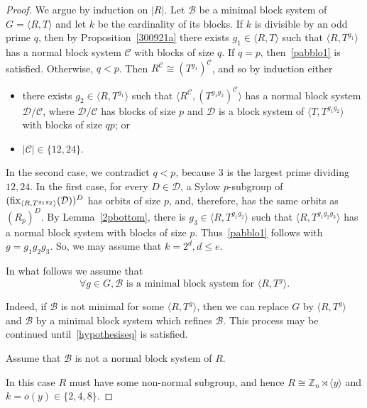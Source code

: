\documentclass[11pt]{amsart}
\numberwithin{equation}{section}
\theoremstyle{definition}
\newcounter{case}
\newenvironment{case}{\refstepcounter{case}
	\medskip \noindent {\bf Case \textup{\thecase.  }}}{\upshape}
\renewcommand{\thecase}{\arabic{case}}
\def\fix{{\rm fix}}
\def\Z{{\mathbb Z}}
\newcommand{\sg}[1]{\langle{#1}\rangle}
\begin{document}
	\begin{proof}
		We argue by
		induction on $|R|$. Let ${\mathcal  B}$ be a minimal  block system of $G=\langle R,T\rangle$ and let $k$ be the cardinality of its blocks.  If $k$ is divisible by an odd prime $q$, then by Proposition~\ref{300921a} there exists $g_1\in \sg{R,T}$ such that $\sg{R,T^{g_1}}$ has a normal block system ${\mathcal  C}$ with blocks of size $q$. If $q = p$, then~\eqref{pabblo1} is satisfied.  Otherwise, $q < p$.  Then $R^{\mathcal  C}\cong (T^{g_1})^{\mathcal  C}$, and so by induction either
		\begin{itemize}
			\item there exists $g_2\in\sg{R,T^{g_1}}$ such that $\sg{R^{\mathcal{C}},(T^{g_1g_2})^{\mathcal{C}}}$ has a normal block system ${\mathcal  D}/{\mathcal  C}$, where ${\mathcal  D}/{\mathcal  C}$ has blocks of size $p$ and ${\mathcal  D}$ is a block system of $\sg{T,T^{g_1g_2}}$ with blocks of size $qp$; or
			\item $|\mathcal{C}|\in \{12,24\}$.
		\end{itemize}
		In the second case, we contradict $q<p$, because $3$ is the largest prime dividing $12,24$.  In the first case, for every $D\in{\mathcal  D}$, a Sylow $p$-subgroup of $(\fix_{\sg{R,T^{g_1g_2}}}({\mathcal  D}))^D$ has 
		orbits of size $p$, and, therefore, has the same orbits as $(R_p)^D$.  By Lemma~\ref{2pbottom}, there is $g_3\in \sg{R,T^{g_1g_2}}$ such that $\sg{R,T^{g_1g_2g_3}}$ has a normal block system with blocks of size $p$. Thus~\eqref{pabblo1} follows with $g = g_1g_2g_3$.  So, we may assume that $k=2^d,d\leq e$.
		
		In what follows we assume that
		\begin{equation}
			\tag{$*$} \label{hypothesiseq}
			\forall g\in G, {\mathcal  B} \text{ is a minimal block system for } \sg{R,T^g}.
		\end{equation}
		
		Indeed, if ${\mathcal  B}$ is not minimal for some $\sg{R,T^g}$, then we can  replace $G$ by $\sg{R,T^g}$ and ${\mathcal  B}$ by a minimal  block system which refines ${\mathcal  B}$. This process may be continued until~\eqref{hypothesiseq} is satisfied. 

        \setcounter{case}{0}
		\begin{case}Assume that ${\mathcal  B}$ is not a normal block system of $R$.\end{case}
		
		
		In this case $R$ must have some non-normal subgroup, and hence $R\cong \Z_n\rtimes\sg{y}$ and $k=o(y)\in\{2,4,8\}$. %
		

\end{proof}
\end{document}
